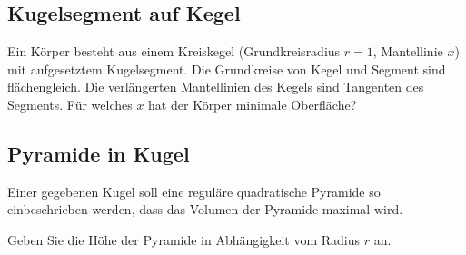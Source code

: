 



\subsection{Kugelsegment auf Kegel}
Ein Körper besteht aus einem Kreiskegel (Grundkreisradius $r=1$,
Mantellinie $x$) mit aufgesetztem Kugelsegment.
Die Grundkreise von Kegel und Segment sind flächengleich.
Die verlängerten Mantellinien des Kegels sind Tangenten des
Segments. Für welches $x$ hat der Körper minimale Oberfläche?





\subsection{Pyramide in Kugel}
Einer gegebenen Kugel soll eine reguläre quadratische Pyramide so einbeschrieben werden, dass das Volumen der Pyramide maximal wird.

Geben Sie die Höhe der Pyramide in Abhängigkeit vom Radius $r$ an.






